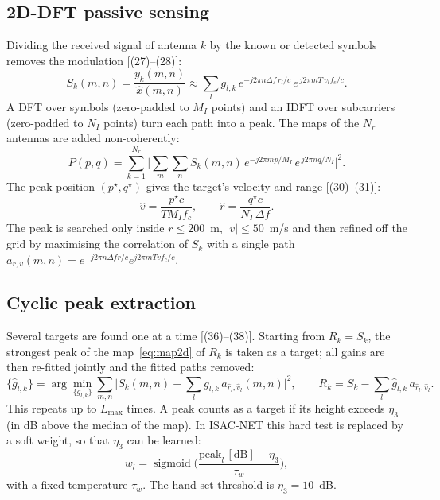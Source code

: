 \documentclass[11pt,a4paper]{article}
\begin{document}
\subsection{2D-DFT passive sensing}
Dividing the received signal of antenna $k$ by the known or detected symbols removes the modulation [(27)--(28)]:
\begin{equation}
  S_k(m,n)=\frac{y_k(m,n)}{\hat{x}(m,n)}\approx\sum_{l}g_{l,k}\,e^{-j2\pi n\Delta f\,r_l/c}\,e^{\,j2\pi mT\,v_lf_c/c}.
\label{eq:div}
\end{equation}
A DFT over symbols (zero-padded to $M_I$ points) and an IDFT over subcarriers (zero-padded to $N_I$ points) turn each path into a peak. The maps of the $N_r$ antennas are added non-coherently:
\begin{equation}
  P(p,q)=\sum_{k=1}^{N_r}\Big|\sum_{m}\sum_{n}S_k(m,n)\,e^{-j2\pi mp/M_I}\,e^{\,j2\pi nq/N_I}\Big|^2 .
\label{eq:map2d}
\end{equation}
The peak position $(p^\star,q^\star)$ gives the target's velocity and range [(30)--(31)]:
\begin{equation}
  \hat{v}=\frac{p^\star c}{T M_I f_c},\qquad \hat{r}=\frac{q^\star c}{N_I\,\Delta f}.
\label{eq:rv}
\end{equation}
The peak is searched only inside $r\le200$~m, $|v|\le50$~m/s and then refined off the grid by maximising the correlation of $S_k$ with a single path $a_{r,v}(m,n)=e^{-j2\pi n\Delta f r/c}e^{j2\pi mTvf_c/c}$.

\subsection{Cyclic peak extraction}
Several targets are found one at a time [(36)--(38)]. Starting from $R_k=S_k$, the strongest peak of the map~\eqref{eq:map2d} of $R_k$ is taken as a target; all gains are then re-fitted jointly and the fitted paths removed:
\begin{equation}
  \{\hat{g}_{l,k}\}=\arg\min_{\{g_{l,k}\}}\sum_{m,n}\Big|S_k(m,n)-\sum_{l}g_{l,k}\,a_{\hat r_l,\hat v_l}(m,n)\Big|^2,\qquad
  R_k=S_k-\sum_{l}\hat{g}_{l,k}\,a_{\hat r_l,\hat v_l}.
\label{eq:clean}
\end{equation}
This repeats up to $L_{\max}$ times. A peak counts as a target if its height exceeds $\eta_3$ (in dB above the median of the map). In ISAC-NET this hard test is replaced by a soft weight, so that $\eta_3$ can be learned:
\begin{equation}
  w_l=\operatorname{sigmoid}\!\Big(\frac{\mathrm{peak}_l\,[\mathrm{dB}]-\eta_3}{\tau_w}\Big),
\label{eq:gate}
\end{equation}
with a fixed temperature $\tau_w$. The hand-set threshold is $\eta_3=10$~dB.
\end{document}
